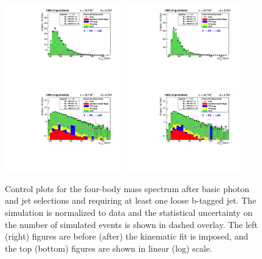 \begin{figure}[htbp!]
 \begin{center}
   \includegraphics[width=0.45\textwidth]{figures/selection/TotalMass_ShapeNormalized_sys.pdf}
   \includegraphics[width=0.45\textwidth]{figures/selection/TotalMassKinFit_ShapeNormalized_sys.pdf}
   \includegraphics[width=0.45\textwidth]{figures/selection/TotalMass_ShapeNormalized_Log_sys.pdf}
   \includegraphics[width=0.45\textwidth]{figures/selection/TotalMassKinFit_ShapeNormalized_Log_sys.pdf}
 \end{center}
\caption{Control plots for the four-body mass spectrum after basic photon and jet selections
and requiring at least one loose b-tagged jet. The simulation is normalized to data and
the statistical uncertainty on the number of simulated events is shown in dashed overlay.
The left (right) figures are before (after) the kinematic fit is imposed, and
the top (bottom) figures are shown in linear (log) scale.}
\label{fig:mggjj_controlplot}
\end{figure}

